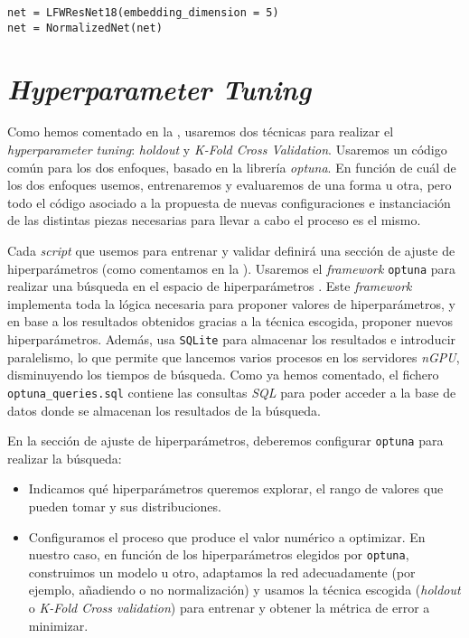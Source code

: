 \begin{lstlisting}[caption={Ejemplo de uso del patrón \textit{Decorator} para decidir si usamos o no normalización. El resto del código no tiene por qué saber este detalle de implementación, porque no cambiamos la interfaz de la clase}, captionpos=b]
net = LFWResNet18(embedding_dimension = 5)
net = NormalizedNet(net)
\end{lstlisting}

\section{\textit{Hyperparameter Tuning}} \label{isec:hp_tuning}

Como hemos comentado en la , usaremos dos técnicas para realizar el \textit{hyperparameter tuning}: \textit{holdout} y \textit{K-Fold Cross Validation}. Usaremos un código común para los dos enfoques, basado en la librería \textit{optuna}. En función de cuál de los dos enfoques usemos, entrenaremos y evaluaremos de una forma u otra, pero todo el código asociado a la propuesta de nuevas configuraciones e instanciación de las distintas piezas necesarias para llevar a cabo el proceso es el mismo.

Cada \textit{script} que usemos para entrenar y validar definirá una sección de ajuste de hiperparámetros (como comentamos en la ). Usaremos el \textit{framework} \lstinline{optuna} para realizar una búsqueda en el espacio de hiperparámetros \cite{informatica:optuna_web}. Este \textit{framework} implementa toda la lógica necesaria para proponer valores de hiperparámetros, y en base a los resultados obtenidos gracias a la técnica escogida, proponer nuevos hiperparámetros. Además, usa \lstinline{SQLite} para almacenar los resultados e introducir paralelismo, lo que permite que lancemos varios procesos en los servidores \textit{nGPU}, disminuyendo los tiempos de búsqueda. Como ya hemos comentado, el fichero \lstinline{optuna_queries.sql} contiene las consultas \textit{SQL} para poder acceder a la base de datos donde se almacenan los resultados de la búsqueda.

En la sección de ajuste de hiperparámetros, deberemos configurar \lstinline{optuna} para realizar la búsqueda:

\begin{itemize}
	\item Indicamos qué hiperparámetros queremos explorar, el rango de valores que pueden tomar y sus distribuciones.
	\item Configuramos el proceso que produce el valor numérico a optimizar. En nuestro caso, en función de los hiperparámetros elegidos por \lstinline{optuna}, construimos un modelo u otro, adaptamos la red adecuadamente (por ejemplo, añadiendo o no normalización) y usamos la técnica escogida (\textit{holdout} o \textit{K-Fold Cross validation}) para entrenar y obtener la métrica de error a minimizar.
\end{itemize}

